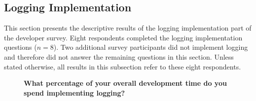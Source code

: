 
\FloatBarrier


\subsection{Logging Implementation}
\label{appendix:logging-implementation}

This section presents the descriptive results of the logging
implementation part of the developer survey. Eight respondents
completed the logging implementation questions ($n=8$). Two additional
survey participants did not implement logging and therefore did not
answer the remaining questions in this section. Unless stated
otherwise, all results in this subsection refer to these eight
respondents.



\begin{figure}[H]
    \centering
    \scriptsize


    \begin{minipage}[t]{0.48\textwidth}
        \centering

        \textbf{\scriptsize
        What percentage of your overall development time do you spend
        implementing logging?}

        \vspace{0.15em}

\end{minipage}
\end{figure}
